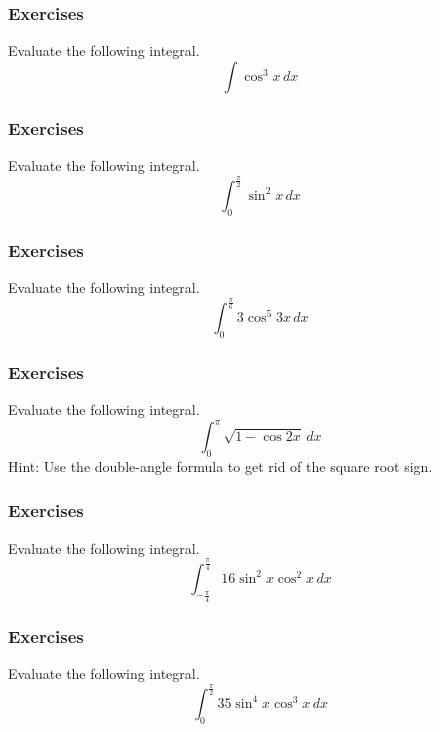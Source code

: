 \documentclass[xcolor=dvipsnames]{beamer}
\begin{document}
\begin{frame}
  \frametitle{Exercises}
  {\ubung} Evaluate the following integral.
  \begin{equation}
    \label{eq:uejahgai}
    \int\cos^{3}x\,dx
  \end{equation}
\end{frame}

\begin{frame}
  \frametitle{Exercises}
  {\ubung} Evaluate the following integral.
  \begin{equation}
    \label{eq:ufiurugo}
    \int_{0}^{\frac{\pi}{2}}\sin^{2}x\,dx
  \end{equation}
\end{frame}

\begin{frame}
  \frametitle{Exercises}
  {\ubung} Evaluate the following integral.
  \begin{equation}
    \label{eq:iepahgai}
    \int_{0}^{\frac{\pi}{6}}3\cos^{5}3x\,dx
  \end{equation}
\end{frame}

\begin{frame}
  \frametitle{Exercises}
  {\ubung} Evaluate the following integral.
  \begin{equation}
    \label{eq:koquohge}
    \int_{0}^{\pi}\sqrt{1-\cos{}2x}\,dx
  \end{equation}
  Hint: Use the double-angle formula to get rid of the square root
  sign.
\end{frame}

\begin{frame}
  \frametitle{Exercises}
  {\ubung} Evaluate the following integral.
  \begin{equation}
    \label{eq:thaemooc}
    \int_{-\frac{\pi}{4}}^{\frac{\pi}{4}}16\sin^{2}x\cos^{2}x\,dx
  \end{equation}
\end{frame}

\begin{frame}
  \frametitle{Exercises}
  {\ubung} Evaluate the following integral.
  \begin{equation}
    \label{eq:noojoosh}
    \int_{0}^{\frac{\pi}{2}}35\sin^{4}x\cos^{3}x\,dx
  \end{equation}
\end{frame}
\end{document}
